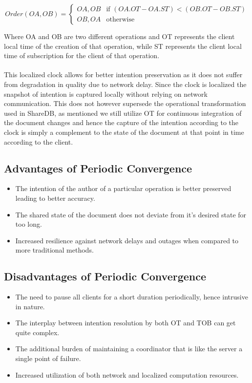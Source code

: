 \documentclass[9pt, titlepage]{article}
\begin{document}
  \begin{equation} \label{total_order_calculation_by_time}
    Order(OA, OB) = 
    \left\{
	    \begin{array}{ll}
        OA, OB & \mbox{if } (OA.OT - OA.ST) < (OB.OT - OB.ST) \\
        OB, OA & \mbox{otherwise }
	    \end{array}
    \right.
  \end{equation}

  Where OA and OB are two different operations and OT represents the client local time of the creation of that operation, while
  ST represents the client local time of subscription for the client of that operation.
  \\ \\
  This localized clock allows for better intention preservation as it does not suffer from degradation in quality due to network delay.
  Since the clock is localized the snapshot of intention is captured locally without relying on network communication. This does not
  however supersede the operational transformation used in ShareDB, as mentioned we still utilize OT for continuous integration of the 
  document changes and hence the capture of the intention according to the clock is simply a complement to the state of the document at
  that point in time according to the client. 

  \subsection{Advantages of Periodic Convergence}
  \begin{itemize}
    \item The intention of the author of a particular operation is better preserved leading to better accuracy.
    \item The shared state of the document does not deviate from it's desired state for too long.
    \item Increased resilience against network delays and outages when compared to more traditional methods.
  \end{itemize}

  \subsection{Disadvantages of Periodic Convergence}
  \begin{itemize}
    \item The need to pause all clients for a short duration periodically, hence intrusive in nature.
    \item The interplay between intention resolution by both OT and TOB can get quite complex.
    \item The additional burden of maintaining a coordinator that is like the server a single point of failure.
    \item Increased utilization of both network and localized computation resources.
  \end{itemize}
\end{document}
